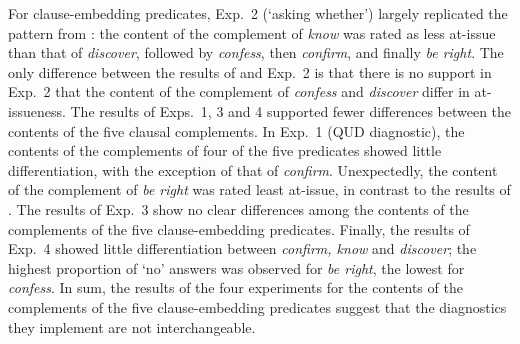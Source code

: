\documentclass[times,linguex]{glossa}
\begin{document}

For clause-embedding predicates, Exp.~2 (`asking whether') largely replicated the pattern from \citet{degen_projection_2025}: the content of the complement of \emph{know} was rated as less at-issue than that of \emph{discover}, followed by \emph{confess}, then \emph{confirm}, and finally \emph{be right}. The only difference between the results of \citet{degen_projection_2025} and Exp.~2 is that there is no support in Exp.~2 that the content of the complement of \emph{confess} and \emph{discover}  differ in at-issueness. The results of Exps.~1, 3 and 4 supported fewer differences between the contents of the five clausal complements. In Exp.~1 (QUD diagnostic), the contents of the complements of four of the five predicates showed little differentiation, with the exception of that of \emph{confirm}. Unexpectedly, the content of the complement of \emph{be right} was rated least at-issue, in contrast to the results of \citealt{degen_projection_2025}. The results of Exp.~3 show no clear differences among the contents of the complements of the five clause-embedding predicates. Finally, the results of Exp.~4 showed little differentiation between \emph{confirm, know} and {\em discover}; the highest proportion of `no' answers was observed for \emph{be right}, the lowest for \emph{confess}. In sum, the results of the four experiments for the contents of the complements of the five clause-embedding predicates suggest that the diagnostics they implement are not interchangeable. %
\end{document}
